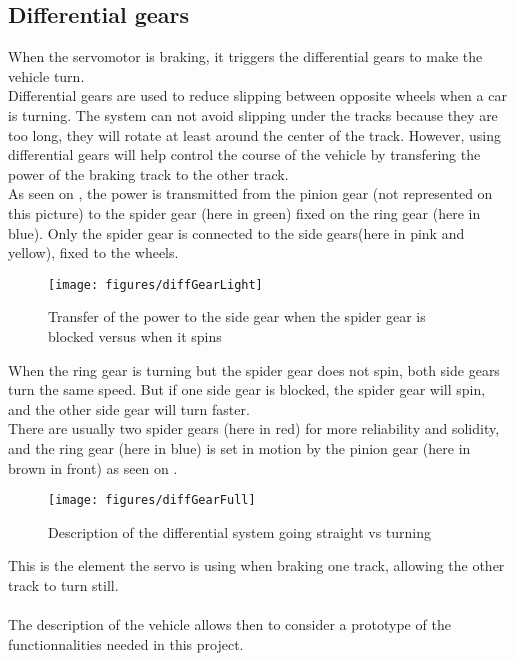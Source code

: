 \subsection{Differential gears} \label{sec:Differentialgears}

When the servomotor is braking, it triggers the differential gears to make the vehicle turn.\\
Differential gears are used to reduce slipping between opposite wheels when a car is turning. The system can not avoid slipping under the tracks because they are too long, they will rotate at least around the center of the track. However, using differential gears will help control the course of the vehicle by transfering the power of the braking track to the other track.\\

As seen on , the power is transmitted from the pinion gear (not represented on this picture) to the spider gear (here in green) fixed on the ring gear (here in blue). Only the spider gear is connected to the side gears(here in pink and yellow), fixed to the wheels.\\

\begin{figure}[H]
	\centering
	\texttt{[image: figures/diffGearLight]}
	\caption{Transfer of the power to the side gear when the spider gear is blocked versus when it spins \cite{MechanicalEngineering}}
	\label{diffGearLight}
\end{figure}

When the ring gear is turning but the spider gear does not spin, both side gears turn the same speed. But if one side gear is blocked, the spider gear will spin,  and the other side gear will turn faster.\\

There are usually two spider gears (here in red) for more reliability and solidity, and the ring gear (here in blue) is set in motion by the pinion gear (here in brown in front) as seen on .\\

\begin{figure}[H]
	\centering
	\texttt{[image: figures/diffGearFull]}
	\caption{Description of the differential system going straight vs turning \cite{MechanicalEngineering}}
	\label{diffGearFull}
\end{figure}

This is the element the servo is using when braking one track, allowing the other track to turn still.\\\\



The description of the vehicle allows then to consider a prototype of the functionnalities needed in this project.


